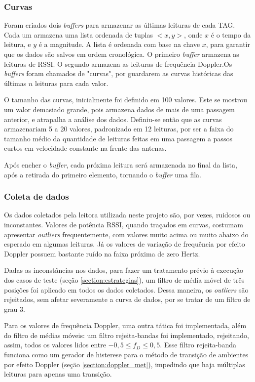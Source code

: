  \subsubsection{Curvas} \label{section:curvas}
 
 Foram criados dois \textit{buffers} para armazenar as últimas leituras de cada TAG. Cada um armazena uma lista ordenada de tuplas $<x,y>$, onde $x$ é o tempo da leitura, e $y$ é a magnitude. A lista é ordenada com base na chave $x$, para garantir que os dados são salvos em ordem cronológica. O primeiro \textit{buffer} armazena as leituras de RSSI. O segundo armazena as leituras de frequência Doppler.Os \textit{buffers} foram chamados de "curvas", por guardarem as curvas históricas das últimas $n$ leituras para cada valor.
 
 O tamanho das curvas, inicialmente foi definido em 100 valores. Este se mostrou um valor demasiado grande, pois armazena dados de mais de uma passagem anterior, e atrapalha a análise dos dados. Definiu-se então que as curvas armazenariam 5 a 20 valores, padronizado em 12 leituras, por ser a faixa do tamanho médio da quantidade de leituras feitas em uma passagem a passos curtos em velocidade constante na frente das antenas.
 
 Após encher o \textit{buffer}, cada próxima leitura será armazenada no final da lista, após a retirada do primeiro elemento, tornando o \textit{buffer} uma fila.

\subsubsection{Coleta de dados}

Os dados coletados pela leitora utilizada neste projeto são, por vezes, ruidosos ou inconstantes. Valores de potência RSSI, quando traçados em curvas, costumam apresentar \textit{outliers} frequentemente, com valores muito acima ou muito abaixo do esperado em algumas leituras. Já os valores de variação de frequência por efeito Doppler possuem bastante ruído na faixa próxima de zero Hertz.

Dadas as inconstâncias nos dados, para fazer um tratamento prévio à execução dos casos de teste (seção \ref{section:estrategias}), um filtro de média móvel de três posições foi aplicado em todos os dados coletados. Dessa maneira, os \textit{outliers} são rejeitados, sem afetar severamente a curva de dados, por se tratar de um filtro de grau 3.

Para os valores de frequência Doppler, uma outra tática foi implementada, além do filtro de médias móveis: um filtro rejeita-bandas foi implementado, rejeitando, assim, todos os valores lidos entre $-0,5\leq f_D\leq 0,5$. Esse filtro rejeita-banda funciona como um gerador de histerese para o método de transição de ambientes por efeito Doppler (seção \ref{section:doppler_met}), impedindo que haja múltiplas leituras para apenas uma transição.
 
